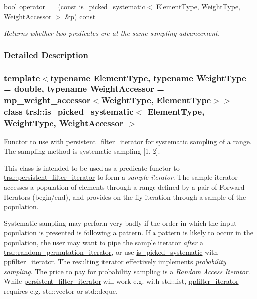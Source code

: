 \begin{DoxyCompactItemize}
bool \hyperlink{classtrsl_1_1is__picked__systematic_aaa69edda00def493c8c50c2d0164f64c}{operator==} (const \hyperlink{classtrsl_1_1is__picked__systematic}{is\_\-picked\_\-systematic}$<$ ElementType, WeightType, WeightAccessor $>$ \&p) const 
\begin{DoxyCompactList}\small\item\em Returns whether two predicates are at the same sampling advancement. \item\end{DoxyCompactList}\end{DoxyCompactItemize}


\subsubsection{Detailed Description}
\subsubsection*{template$<$typename ElementType, typename WeightType = double, typename WeightAccessor = mp\_\-weight\_\-accessor$<$WeightType, ElementType$>$$>$ class trsl::is\_\-picked\_\-systematic$<$ ElementType, WeightType, WeightAccessor $>$}

Functor to use with \hyperlink{classtrsl_1_1persistent__filter__iterator}{persistent\_\-filter\_\-iterator} for systematic sampling of a range. The sampling method is systematic sampling \mbox{[}1, 2\mbox{]}.

This class is intended to be used as a predicate functor to \hyperlink{classtrsl_1_1persistent__filter__iterator}{trsl::persistent\_\-filter\_\-iterator} to form a {\itshape sample iterator\/}. The sample iterator accesses a population of elements through a range defined by a pair of Forward Iterators (begin/end), and provides on-\/the-\/fly iteration through a sample of the population.

Systematic sampling may perform very badly if the order in which the input population is presented is following a pattern. If a pattern is likely to occur in the population, the user may want to pipe the sample iterator {\itshape after\/} a \hyperlink{namespacetrsl_afb566791dfade70af49beaa5b816e7ee}{trsl::random\_\-permutation\_\-iterator}, or use \hyperlink{classtrsl_1_1is__picked__systematic}{is\_\-picked\_\-systematic} with \hyperlink{classtrsl_1_1ppfilter__iterator}{ppfilter\_\-iterator}. The resulting iterator effectively implements {\itshape probability sampling\/}. The price to pay for probability sampling is a {\itshape Random Access Iterator\/}. While \hyperlink{classtrsl_1_1persistent__filter__iterator}{persistent\_\-filter\_\-iterator} will work e.g. with {\ttfamily std::list}, \hyperlink{classtrsl_1_1ppfilter__iterator}{ppfilter\_\-iterator} requires e.g. {\ttfamily std::vector} or {\ttfamily std::deque}.


